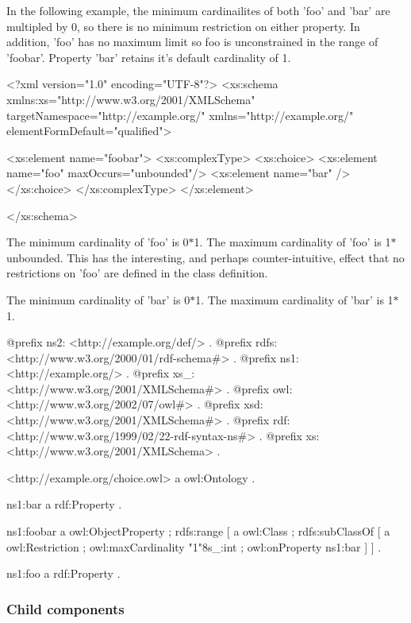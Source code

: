In the following example, the minimum cardinailites of both 'foo' and 'bar' are multipled by 0, so there is no minimum restriction on either property. In addition, 'foo' has no maximum limit so foo is unconstrained in the range of 'foobar'. Property 'bar' retains it's default cardinality of 1.


\begin{DoxyCodeInclude}
<?xml version="1.0" encoding="UTF-8"?>
<xs:schema xmlns:xs="http://www.w3.org/2001/XMLSchema"
        targetNamespace="http://example.org/" xmlns="http://example.org/"
        elementFormDefault="qualified">
        
        <xs:element name="foobar">
                <xs:complexType>
                        <xs:choice>
                                <xs:element name="foo" maxOccurs="unbounded"/>
                                <xs:element name="bar" />
                        </xs:choice>
                </xs:complexType>
        </xs:element>

</xs:schema>
\end{DoxyCodeInclude}


The minimum cardinality of 'foo' is 0$\ast$1. The maximum cardinality of 'foo' is 1$\ast$unbounded. This has the interesting, and perhaps counter-\/intuitive, effect that no restrictions on 'foo' are defined in the class definition.

The minimum cardinality of 'bar' is 0$\ast$1. The maximum cardinality of 'bar' is 1$\ast$1.


\begin{DoxyCodeInclude}
@prefix ns2:     <http://example.org/def/> .
@prefix rdfs:    <http://www.w3.org/2000/01/rdf-schema#> .
@prefix ns1:     <http://example.org/> .
@prefix xs_:     <http://www.w3.org/2001/XMLSchema#> .
@prefix owl:     <http://www.w3.org/2002/07/owl#> .
@prefix xsd:     <http://www.w3.org/2001/XMLSchema#> .
@prefix rdf:     <http://www.w3.org/1999/02/22-rdf-syntax-ns#> .
@prefix xs:      <http://www.w3.org/2001/XMLSchema> .

<http://example.org/choice.owl>
      a       owl:Ontology .

ns1:bar
      a       rdf:Property .

ns1:foobar
      a       owl:ObjectProperty ;
      rdfs:range
              [ a       owl:Class ;
                rdfs:subClassOf
                        [ a       owl:Restriction ;
                          owl:maxCardinality "1"^^xs_:int ;
                          owl:onProperty ns1:bar
                        ]
              ] .

ns1:foo
      a       rdf:Property .
\end{DoxyCodeInclude}
\hypertarget{sequence_sequenceChildren}{}\subsubsection{Child components}\label{sequence_sequenceChildren}


